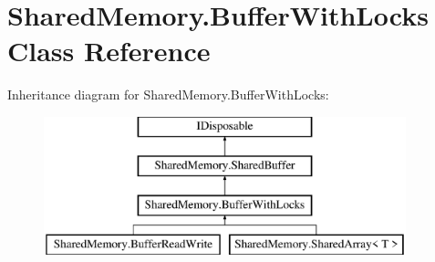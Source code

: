 \hypertarget{class_shared_memory_1_1_buffer_with_locks}{}\section{Shared\+Memory.\+Buffer\+With\+Locks Class Reference}
\label{class_shared_memory_1_1_buffer_with_locks}


 


Inheritance diagram for Shared\+Memory.\+Buffer\+With\+Locks\+:\begin{figure}[H]
\begin{center}
\leavevmode
\includegraphics[height=4.000000cm]{class_shared_memory_1_1_buffer_with_locks}
\end{center}
\end{figure}
